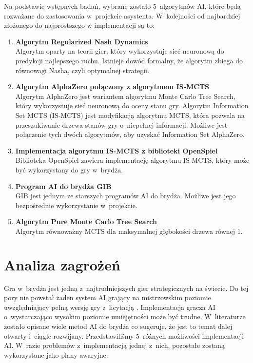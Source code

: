 Na podstawie wstępnych badań, wybrane zostało 5~algorytmów AI,
które będą rozważane do zastosowania w~projekcie asystenta.
W~kolejności od najbardziej złożonego do
najprostszego w implementacji są to:
\begin{enumerate}
  \item \textbf{Algorytm Regularized Nash Dynamics \cite{doi:10.1126/science.add4679}}\\
  Algorytm oparty na teorii gier, który wykorzystuje sieć neuronową do
  predykcji najlepszego ruchu. Istnieje dowód formalny, że algorytm
  zbiega do równowagi Nasha, czyli optymalnej strategii.
  
  \item \textbf{Algorytm AlphaZero \cite{AlphaZeroPaper} połączony z algorytmem IS-MCTS \cite{6203567}}\\
  Algorytm AlphaZero jest wariantem algorytmu Monte Carlo Tree Search,
  który wykorzystuje sieć neuronową do oceny stanu gry.
  Algorytm Information Set MCTS (IS-MCTS) jest modyfikacją algorytmu MCTS, która pozwala na
  przeszukiwanie drzewa stanów gry o~niepełnej informacji.
  Możliwe jest połączenie tych dwóch algorytmów, aby uzyskać
  Information Set AlphaZero.
  
  \item \textbf{Implementacja algorytmu IS-MCTS z biblioteki OpenSpiel \cite{LanctotEtAl2019OpenSpiel}}\\
  Biblioteka OpenSpiel zawiera implementację algorytmu IS-MCTS,
  który może być wykorzystany do gry w~brydża.

  \item \textbf{Program AI do brydża GIB \cite{Ginsberg1999GIBST}}\\
  GIB jest jednym ze starszych programów AI do brydża. Możliwe jest
  jego bezpośrednie wykorzystanie w~projekcie.

  \item \textbf{Algorytm Pure Monte Carlo Tree Search \cite{pmcts}}\\
  Algorytm równoważny MCTS dla maksymalnej głębokości drzewa równej 1.
\end{enumerate}



\section{Analiza zagrożeń}

Gra w~brydża jest jedną z~najtrudniejszych gier strategicznych na świecie.
Do tej pory nie powstał żaden system AI grający na mistrzowskim poziomie
uwzględniający pełną wersję gry z~licytacją \cite{Bethe2021AdvancesIC}.
Implementacja gracza AI o~wystarczająco wysokim poziomie umiejętności może być
trudne. W~literaturze zostało opisane wiele metod AI do brydża
\cite{Zhang2019DesignAD,Zhang2022TheSO,Zhang2022AIEB,Ginsberg1999GIBST}
co sugeruje, że jest to temat dalej otwarty i~ciągle rozwijany.
Przedstawiliśmy 5~różnych możliwości implementacji AI.
W~razie problemów z~implementacją jednej z~nich, pozostałe
zostaną wykorzystane jako plany awaryjne.

